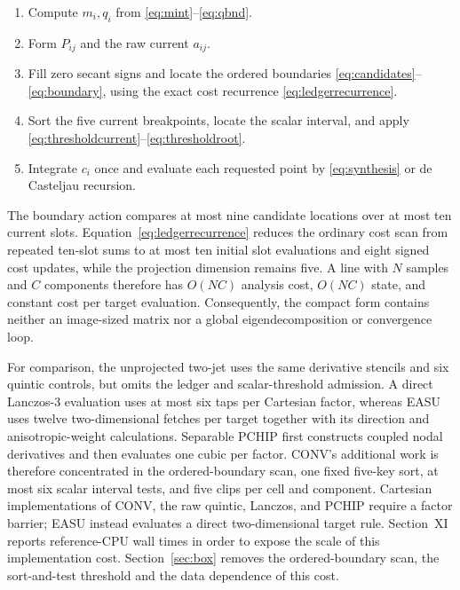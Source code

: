 \documentclass[journal]{IEEEtran}
\begin{document}
\begin{enumerate}
\item Compute \(m_i,q_i\) from \eqref{eq:mint}--\eqref{eq:qbnd}.
\item Form \(P_{ij}\) and the raw current \(a_{ij}\).
\item Fill zero secant signs and locate the ordered boundaries
      \eqref{eq:candidates}--\eqref{eq:boundary}, using the exact cost
      recurrence \eqref{eq:ledgerrecurrence}.
\item Sort the five current breakpoints, locate the scalar interval, and
      apply \eqref{eq:thresholdcurrent}--\eqref{eq:thresholdroot}.
\item Integrate \(c_i\) once and evaluate each requested point by
      \eqref{eq:synthesis} or de Casteljau recursion.
\end{enumerate}

The boundary action compares at most nine candidate locations over at most
ten current slots. Equation~\eqref{eq:ledgerrecurrence} reduces the ordinary
cost scan from repeated ten-slot sums to at most ten initial slot evaluations
and eight signed cost updates, while the projection dimension remains five. A line with
\(N\) samples and \(C\) components therefore has \(O(NC)\) analysis cost,
\(O(NC)\) state, and constant cost per target evaluation. Consequently, the
compact form contains neither an image-sized matrix nor a global
eigendecomposition or convergence loop.

For comparison, the unprojected two-jet uses the same derivative stencils and
six quintic controls, but omits the ledger and scalar-threshold admission. A
direct Lanczos-3 evaluation uses at most six taps per Cartesian factor,
whereas EASU uses twelve two-dimensional fetches per target together with its
direction and anisotropic-weight calculations. Separable PCHIP first
constructs coupled nodal derivatives and then evaluates one cubic per factor.
CONV's additional work is therefore concentrated in the ordered-boundary
scan, one fixed five-key sort, at most six scalar interval tests, and five
clips per cell and component. Cartesian implementations of CONV, the raw
quintic, Lanczos, and PCHIP require a factor barrier; EASU instead evaluates a
direct two-dimensional target rule. Section~XI reports reference-CPU wall
times in order to expose the scale of this implementation cost.
Section~\ref{sec:box} removes the ordered-boundary scan, the sort-and-test
threshold and the data dependence of this cost.
\end{document}
